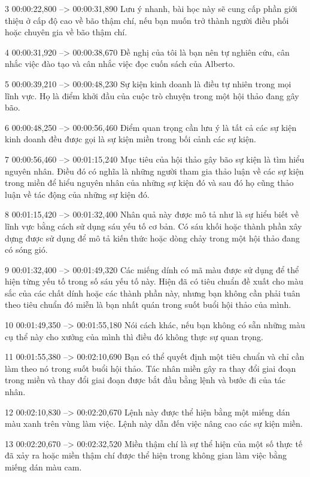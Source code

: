 3
00:00:22,800 --> 00:00:31,890
Lưu ý nhanh, bài học này sẽ cung cấp phần giới thiệu ở cấp độ cao về bão thậm chí, nếu bạn muốn trở thành người điều phối hoặc chuyên gia về bão thậm chí.

4
00:00:31,920 --> 00:00:38,670
Đề nghị của tôi là bạn nên tự nghiên cứu, cân nhắc việc đào tạo và cân nhắc việc đọc cuốn sách của Alberto.

5
00:00:39,210 --> 00:00:48,230
Sự kiện kinh doanh là điều tự nhiên trong mọi lĩnh vực.  Họ là điểm khởi đầu của cuộc trò chuyện trong một hội thảo đang gây bão.

6
00:00:48,250 --> 00:00:56,460
Điểm quan trọng cần lưu ý là tất cả các sự kiện kinh doanh đều được gọi là sự kiện miền trong bối cảnh các sự kiện.

7
00:00:56,460 --> 00:01:15,240
Mục tiêu của hội thảo gây bão sự kiện là tìm hiểu nguyên nhân.  Điều đó có nghĩa là những người tham gia thảo luận về các sự kiện trong miền để hiểu nguyên nhân của những sự kiện đó và sau đó họ cũng thảo luận về tác động của những sự kiện đó.

8
00:01:15,420 --> 00:01:32,400
Nhân quả này được mô tả như là sự hiểu biết về lĩnh vực bằng cách sử dụng sáu yếu tố cơ bản.  Có sáu khối hoặc thành phần xây dựng được sử dụng để mô tả kiến ​​thức hoặc dòng chảy trong một hội thảo đang có sóng gió.

9
00:01:32,400 --> 00:01:49,320
Các miếng dính có mã màu được sử dụng để thể hiện từng yếu tố trong số sáu yếu tố này.  Hiện đã có tiêu chuẩn đề xuất cho màu sắc của các chất dính hoặc các thành phần này, nhưng bạn không cần phải tuân theo tiêu chuẩn đó miễn là bạn nhất quán trong suốt buổi hội thảo của mình.

10
00:01:49,350 --> 00:01:55,180
Nói cách khác, nếu bạn không có sẵn những màu cụ thể này cho xưởng của mình thì điều đó không thực sự quan trọng.

11
00:01:55,380 --> 00:02:10,690
Bạn có thể quyết định một tiêu chuẩn và chỉ cần làm theo nó trong suốt buổi hội thảo.  Tác nhân miền gây ra thay đổi giai đoạn trong miền và thay đổi giai đoạn được bắt đầu bằng lệnh và bước đi của tác nhân.

12
00:02:10,830 --> 00:02:20,670
Lệnh này được thể hiện bằng một miếng dán màu xanh trên vùng làm việc.  Lệnh này dẫn đến việc nâng cao các sự kiện miền.

13
00:02:20,670 --> 00:02:32,520
Miền thậm chí là sự thể hiện của một số thực tế đã xảy ra hoặc miền thậm chí được thể hiện trong không gian làm việc bằng miếng dán màu cam.

